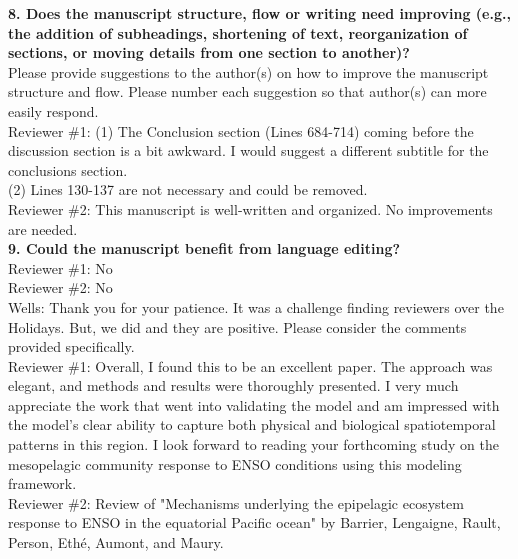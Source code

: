 \documentclass[12pt]{article}
\begin{document}
\textbf{8. Does the manuscript structure, flow or writing need improving (e.g., the addition of subheadings, shortening of text, reorganization of sections, or moving details from one section to another)?}\\

Please provide suggestions to the author(s) on how to improve the manuscript structure and flow. Please number each suggestion so that author(s) can more easily respond.\\

Reviewer \#1: (1) The Conclusion section (Lines 684-714) coming before the discussion section is a bit awkward. I would suggest a different subtitle for the conclusions section.\\
(2) Lines 130-137 are not necessary and could be removed.\\



Reviewer \#2: This manuscript is well-written and organized. No improvements are needed.\\

\textbf{9. Could the manuscript benefit from language editing?}\\

Reviewer \#1: No\\

Reviewer \#2: No\\

Wells: Thank you for your patience. It was a challenge finding reviewers over the Holidays. But, we did and they are positive. Please consider the comments provided specifically.\\

Reviewer \#1: Overall, I found this to be an excellent paper. The approach was elegant, and methods and results were thoroughly presented. I very much appreciate the work that went into validating the model and am impressed with the model's clear ability to capture both physical and biological spatiotemporal patterns in this region. I look forward to reading your forthcoming study on the mesopelagic community response to ENSO conditions using this modeling framework.\\

Reviewer \#2: Review of "Mechanisms underlying the epipelagic ecosystem response to ENSO in the equatorial Pacific ocean" by Barrier, Lengaigne, Rault, Person, Ethé, Aumont, and Maury.\\
\end{document}
